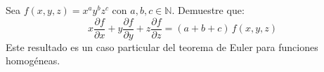 Sea $f(x, y, z) = x^a y^b z^c$ con $a, b, c \in \mathbb{N}$. Demuestre que:
\[
x \frac{\partial f}{\partial x} + y \frac{\partial f}{\partial y} + z \frac{\partial f}{\partial z} = (a + b + c)\, f(x, y, z)
\]
Este resultado es un caso particular del teorema de Euler para funciones homogéneas.
